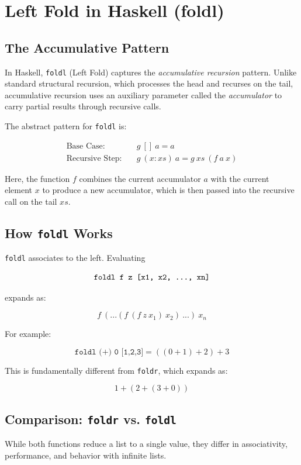 \documentclass[12pt]{article}
\begin{document}
\section{Left Fold in Haskell (foldl)}

\subsection{The Accumulative Pattern}
In Haskell, \texttt{foldl} (Left Fold) captures the \emph{accumulative recursion} pattern. Unlike standard structural recursion, which processes the head and recurses on the tail, accumulative recursion uses an auxiliary parameter called the \emph{accumulator} to carry partial results through recursive calls.

The abstract pattern for \texttt{foldl} is:

\[
    \begin{aligned}
        \text{Base Case:}      & \quad g\ []\ a = a                    \\
        \text{Recursive Step:} & \quad g\ (x:xs)\ a = g\ xs\ (f\ a\ x)
    \end{aligned}
\]

Here, the function \(f\) combines the current accumulator \(a\) with the current element \(x\) to produce a new accumulator, which is then passed into the recursive call on the tail \(xs\).

\subsection{How \texttt{foldl} Works}
\texttt{foldl} associates to the left. Evaluating

\[
    \texttt{foldl f z [x1, x2, \dots, xn]}
\]

expands as:

\[
    f\ (...(f\ (f\ z\ x_1)\ x_2)\ ...)\ x_n
\]

For example:

\[
    \texttt{foldl (+) 0 [1,2,3]} = ((0 + 1) + 2) + 3
\]

This is fundamentally different from \texttt{foldr}, which expands as:

\[
    1 + (2 + (3 + 0))
\]

\subsection{Comparison: \texttt{foldr} vs. \texttt{foldl}}
While both functions reduce a list to a single value, they differ in associativity, performance, and behavior with infinite lists.
\end{document}

